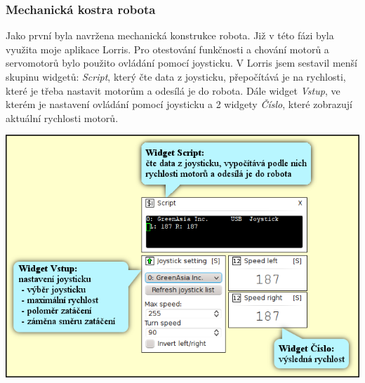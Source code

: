 \documentclass[12pt, a4paper, oneside]{article}
\newcommand{\It}{\textit}  %
\begin{document}
\subsubsection{Mechanická kostra robota}
Jako první byla navržena mechanická konstrukce robota. Již v této fázi byla využita moje aplikace Lorris. Pro otestování funkčnosti a chování motorů a servomotorů bylo použito ovládání pomocí joysticku. V Lorris jsem sestavil menší skupinu widgetů: \It{Script}, který čte data z joysticku, přepočítává je na rychlosti, které je třeba nastavit motorům a odesílá je do robota. Dále widget \It{Vstup}, ve kterém je nastavení ovládání pomocí joysticku a 2 widgety \It{Číslo}, které zobrazují aktuální rychlosti motorů.
\vspace{30mm}
\begin{center}
\includegraphics[width=\textwidth]{img/joystick_david.png}
\end{center}

\newpage
\end{document}
